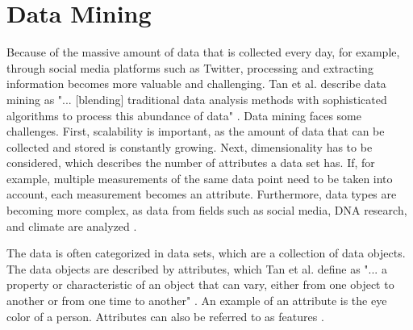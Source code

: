 \section{Data Mining}
Because of the massive amount of data that is collected every day, for example, through social media platforms such as Twitter, processing and extracting information becomes more valuable and challenging. Tan et al. describe data mining as "... [blending] traditional data analysis methods with sophisticated algorithms to process this abundance of data" \cite[p.~21]{DBLP:books/aw/TanSKK2019}. Data mining faces some challenges. First, scalability is important, as the amount of data that can be collected and stored is constantly growing. Next, dimensionality has to be considered, which describes the number of attributes a data set has. If, for example, multiple measurements of the same data point need to be taken into account, each measurement becomes an attribute. Furthermore, data types are becoming more complex, as data from fields such as social media, DNA research, and climate are analyzed \cite{DBLP:books/aw/TanSKK2019}.

The data is often categorized in data sets, which are a collection of data objects. The data objects are described by attributes, which Tan et al. define as "... a property or characteristic of an object that can vary, either from one object to another or from one time to another" \cite[p.~47]{DBLP:books/aw/TanSKK2019}. An example of an attribute is the eye color of a person. Attributes can also be referred to as features \cite{DBLP:books/aw/TanSKK2019}.

